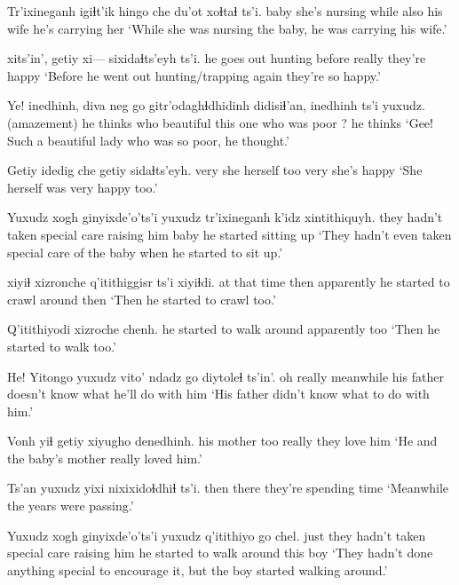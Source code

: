 \documentclass[12pt]{article}
\begin{document}
\gll Tr'ixineganh igiɬt'ik      hingo che  du'ot    xoɬtaɬ            ts'i.
baby         {she's nursing} while also {his wife} {he's carrying her}
\glt `While she was nursing the baby, he was carrying his wife.'
\glend

     xits'in', getiy xi--- sixidaɬts'eyh ts'i.
{he goes out hunting} before   really {} {they're happy}
\glt `Before he went out hunting/trapping again they're so happy.'
\glend

\gll Ye! inedhinh, diva neg       go   gitr'odaghɬdhidinh didisiɬ'an, inedhinh ts'i yuxudz.
(amazement) {he thinks}  who  beautiful this {one who was poor}    ?   {he thinks}
\glt `Gee! Such a beautiful lady who was so poor, he thought.'
\glend

\gll Getiy idedig che getiy sidaɬts'eyh.
  very  {she herself} too very {she's happy}
\glt `She herself was very happy too.'
\glend

\gll Yuxudz {xogh ginyixde'o'ts'i}      yuxudz {tr'ixineganh k'idz} xintithiquyh.
{}    {they hadn't taken special care raising him}  {}    baby               {he started sitting up}
\glt `They hadn't even taken special care of the baby when he started to sit up.'
\glend

 xiyiɬ xizronche q'itithiggisr              ts'i xiyiɬdi.
{at that time}    then apparently       {he started to crawl around} {} then
\glt `Then he started to crawl too.'
\glend

\gll Q'itithiyodi xizroche chenh.
{{he started to walk around}} apparently too
\glt `Then he started to walk too.'
\glend

\gll He! Yitongo yuxudz vito'      {ndadz go}   diytoleɬ          ts'in'.
{oh really}  meanwhile   {}   {his father} {doesn't know what} {he'll do with him}
\glt `His father didn't know what to do with him.'
\glend

\gll Vonh       yiɬ getiy  {xiyugho denedhinh.}
{his mother} too really {they love him}
\glt `He and the baby's mother really loved him.'
\glend

\gll Ts'an yuxudz yixi {nixixidoɬdhiɬ ts'i.}
then {}  there {they're spending time}
\glt `Meanwhile the years were passing.'
\glend

\gll Yuxudz {xogh ginyixde'o'ts'i} yuxudz q'itithiyo                go   chel.
just    {they hadn't taken special care raising him}  {}      {he started to walk around} this boy   
\glt `They hadn't done anything special to encourage it, but the boy started walking around.'
\glend
\end{document}
